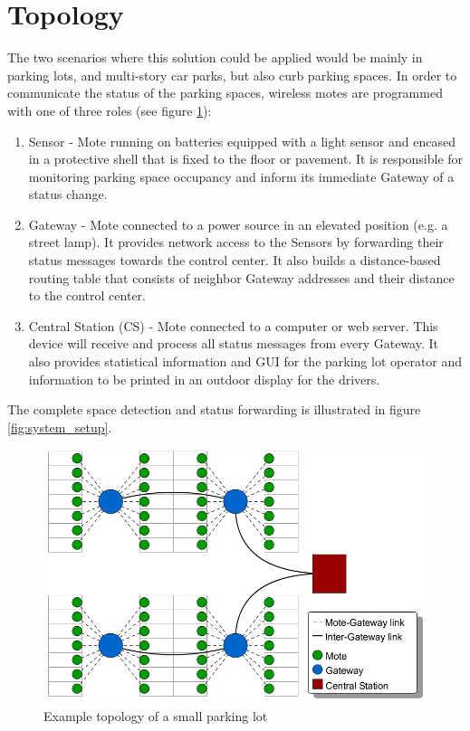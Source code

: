 \section{Topology}
\label{sec:topology}
The two scenarios where this solution could be applied would be mainly in parking lots, and multi-story car parks, but also curb parking spaces.
In order to communicate the status of the parking spaces, wireless motes are programmed with one of three roles (see figure \ref{fig:topology}):
\begin{enumerate}
	\item Sensor - Mote running on batteries equipped with a light sensor and encased in a protective shell that is fixed to the floor or pavement.
	It is responsible for monitoring parking space occupancy and inform its immediate Gateway of a status change.
	\item Gateway - Mote connected to a power source in an elevated position (e.g. a street lamp). 
	It provides network access to the Sensors by forwarding their status messages towards the control center. 
	It also builds a distance-based routing table that consists of neighbor Gateway addresses and their distance to the control center.
	\item Central Station (CS) - Mote connected to a computer or web server. This device will receive and process all status messages from every Gateway. 
	It also provides statistical information and GUI for the parking lot operator and information to be printed in an outdoor display for the drivers.
\end{enumerate}
The complete space detection and status forwarding is illustrated in figure \ref{fig:system_setup}.

\begin{figure}
    \centering
    \includegraphics[width=15cm]{images/General_ParkingLotTopology.png}
	\vspace{-1.5em}
    \caption{Example topology of a small parking lot}
    \vspace{-1.5em}
    \label{fig:topology}
\end{figure}

